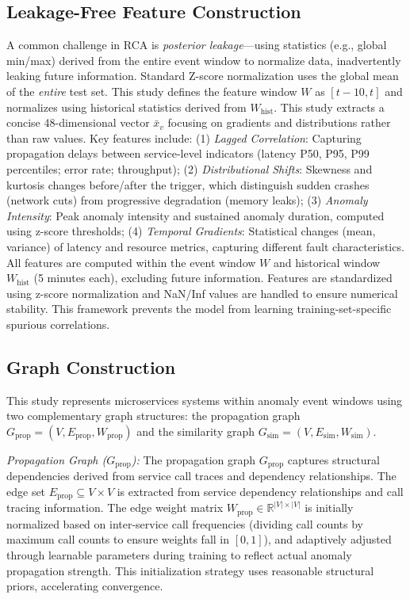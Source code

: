 \documentclass[conference]{IEEEtran}
\begin{document}
\subsection{Leakage-Free Feature Construction}

A common challenge in RCA is \textit{posterior leakage}---using statistics (e.g., global min/max) derived from the entire event window to normalize data, inadvertently leaking future information. Standard Z-score normalization uses the global mean of the \textit{entire} test set. This study defines the feature window $W$ as $[t-10, t]$ and normalizes using historical statistics derived from $W_{\text{hist}}$. This study extracts a concise 48-dimensional vector $\bar{x}_v$ focusing on gradients and distributions rather than raw values. Key features include: (1) \textit{Lagged Correlation}: Capturing propagation delays between service-level indicators (latency P50, P95, P99 percentiles; error rate; throughput); (2) \textit{Distributional Shifts}: Skewness and kurtosis changes before/after the trigger, which distinguish sudden crashes (network cuts) from progressive degradation (memory leaks); (3) \textit{Anomaly Intensity}: Peak anomaly intensity and sustained anomaly duration, computed using z-score thresholds; (4) \textit{Temporal Gradients}: Statistical changes (mean, variance) of latency and resource metrics, capturing different fault characteristics. All features are computed within the event window $W$ and historical window $W_{\text{hist}}$ (5 minutes each), excluding future information. Features are standardized using z-score normalization and NaN/Inf values are handled to ensure numerical stability. This framework prevents the model from learning training-set-specific spurious correlations.

\subsection{Graph Construction}

This study represents microservices systems within anomaly event windows using two complementary graph structures: the propagation graph $G_{\text{prop}} = (V, E_{\text{prop}}, W_{\text{prop}})$ and the similarity graph $G_{\text{sim}} = (V, E_{\text{sim}}, W_{\text{sim}})$.

\textit{Propagation Graph ($G_{\text{prop}}$):} The propagation graph $G_{\text{prop}}$ captures structural dependencies derived from service call traces and dependency relationships. The edge set $E_{\text{prop}} \subseteq V \times V$ is extracted from service dependency relationships and call tracing information. The edge weight matrix $W_{\text{prop}} \in \mathbb{R}^{|V| \times |V|}$ is initially normalized based on inter-service call frequencies (dividing call counts by maximum call counts to ensure weights fall in $[0, 1]$), and adaptively adjusted through learnable parameters during training to reflect actual anomaly propagation strength. This initialization strategy uses reasonable structural priors, accelerating convergence.
\end{document}
